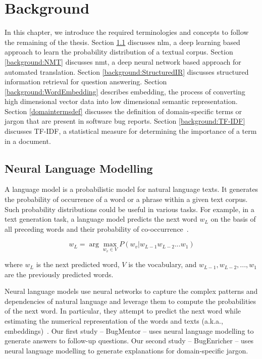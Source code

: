 \chapter{Background}

In this chapter, we introduce the required terminologies and concepts to follow the remaining of the thesis. 
Section \ref{background:LM} discusses \acrfull{nlm}, a deep learning based approach to learn the probability distribution of a textual corpus. Section \ref{background:NMT} discusses \acrfull{nmt}, a deep neural network based approach for automated translation. Section \ref{background:StructuredIR} discusses structured information retrieval for question answering. Section \ref{background:WordEmbedding} describes embedding, the process of converting high dimensional vector data into low dimensional semantic representation. 
Section \ref{domaintermsdef} discusses the definition of domain-specific terms or jargon that are present in software bug reports.
Section \ref{background:TF-IDF} discusses TF-IDF, a statistical measure for determining the importance of a term in a document.\par

\section {Neural Language Modelling}\label{background:LM}

A language model is a probabilistic model for natural language texts. It generates the probability of occurrence of a word or a phrase within a given text corpus. Such probability distributions could be useful in various tasks. For example, in a text generation task, a language model predicts the next word $w_L$  on the basis of all preceding words and their probability of co-occurrence~\cite{hu2018deep,mahbub2023comprehending}.\par

\begin{equation}
    w_L = \arg\max_{w_v \in V} P(w_v | w_{L-1} w_{L-2} ... w_1)
\end{equation}

where $w_L$ is the next predicted word, $V$ is the vocabulary, and $w_{L-1}, w_{L-2}, ..., w_1$ are the previously predicted words.\par

Neural language models use neural networks to capture the complex patterns and dependencies of natural language and leverage them to compute the probabilities of the next word. In particular, they attempt to predict the next word while estimating the numerical representation of the words and texts (a.k.a., embeddings)~\cite{zhang2021natural}. Our first study -- BugMentor -- uses neural language modelling to generate answers to follow-up questions. Our second study -- BugEnricher -- uses neural language modelling to generate explanations for domain-specific jargon.\par

